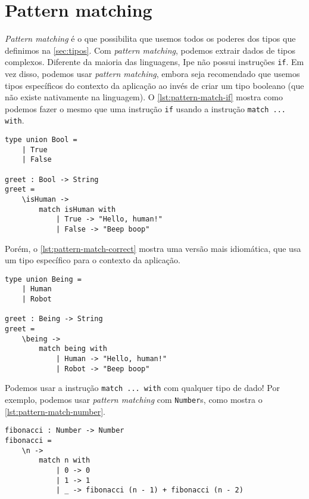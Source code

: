 \section{Pattern matching}\label{sec:pattern-matching}

\textit{Pattern matching} é o que possibilita que usemos todos os poderes dos
tipos que definimos na \autoref{sec:tipos}. Com \textit{pattern matching}, podemos
extrair dados de tipos complexos. Diferente da maioria das linguagens, Ipe não
possui instruções \texttt{if}. Em vez disso, podemos usar \textit{pattern matching},
embora seja recomendado que usemos tipos específicos do contexto da aplicação ao
invés de criar um tipo booleano (que não existe nativamente na linguagem).
O \autoref{lst:pattern-match-if} mostra como podemos fazer o mesmo que uma
instrução \texttt{if} usando a instrução \texttt{match ... with}.


\begin{lstlisting}[label={lst:pattern-match-if},caption={Substituto de if usando \textit{pattern matching}}]
type union Bool =
    | True
    | False

greet : Bool -> String
greet =
    \isHuman ->
        match isHuman with
            | True -> "Hello, human!"
            | False -> "Beep boop"
\end{lstlisting}

Porém, o \autoref{lst:pattern-match-correct} mostra uma versão mais idiomática,
que usa um tipo específico para o contexto da aplicação.

\begin{lstlisting}[label={lst:pattern-match-correct},caption={Maneira idiomática da função greet}]
type union Being =
    | Human
    | Robot

greet : Being -> String
greet =
    \being ->
        match being with
            | Human -> "Hello, human!"
            | Robot -> "Beep boop"
\end{lstlisting}

Podemos usar a instrução \texttt{match ... with} com qualquer tipo de dado! Por
exemplo, podemos usar \textit{pattern matching} com \texttt{Number}s, como mostra
o \autoref{lst:pattern-match-number}.

\begin{lstlisting}[label={lst:pattern-match-number},caption={Pattern matching com números}]
fibonacci : Number -> Number
fibonacci =
    \n ->
        match n with
            | 0 -> 0
            | 1 -> 1
            | _ -> fibonacci (n - 1) + fibonacci (n - 2)
\end{lstlisting}

